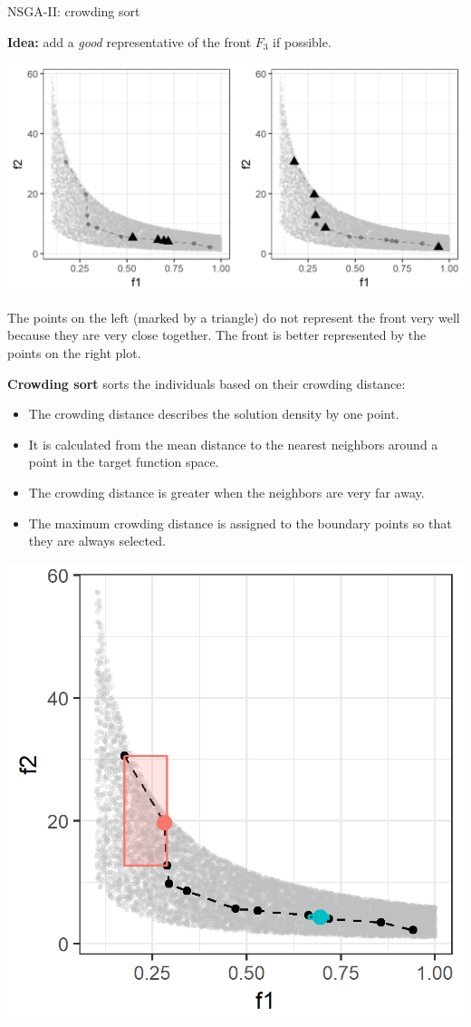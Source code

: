 \begin{frame}[allowframebreaks]{NSGA-II: crowding sort}

\textbf{Idea:} add a \textit{good} representative of the front $F_3$ if possible.

\begin{center}
\includegraphics[height = 0.5\textheight]{images/NSGA2_CS1.png}
\end{center}

\begin{footnotesize}
The points on the left (marked by a triangle) do not represent the front very well because they are very close together. The front is better represented by the points on the right plot.
\end{footnotesize}

\framebreak

\textbf{Crowding sort} sorts the individuals based on their crowding distance:

\begin{itemize}
\item The crowding distance describes the solution density by one point.
\item It is calculated from the mean distance to the nearest neighbors around a point in the target function space.
\item The crowding distance is greater when the neighbors are very far away.
\item The maximum crowding distance is assigned to the boundary points so that they are always selected.
\end{itemize}

\begin{center}
\includegraphics[width = 0.4\linewidth]{images/NSGA2_CS2.png}
\end{center}


\end{frame}
